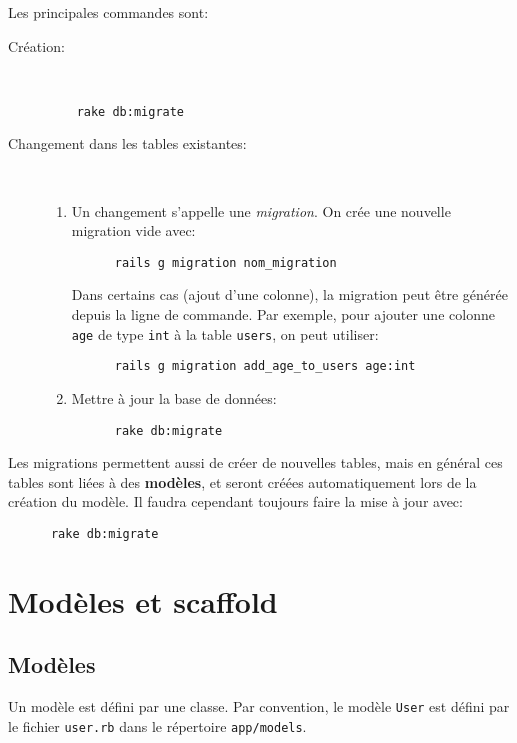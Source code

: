 \documentclass{article}
\begin{document}
Les principales commandes sont:
\begin{description}
\item[Création:] ~\\
  \begin{lstlisting}
    rake db:migrate
  \end{lstlisting}
\item[Changement dans les tables existantes:] ~\\
  \begin{enumerate}
  \item Un changement s'appelle une \emph{migration}. On crée une
    nouvelle migration vide avec:
    \begin{lstlisting}
      rails g migration nom_migration
    \end{lstlisting}
    Dans certains cas (ajout d'une colonne), la migration peut être générée depuis
    la ligne de commande. Par exemple, pour ajouter une colonne \texttt{age} de type \texttt{int}
    à la table \texttt{users}, on peut utiliser:
    \begin{lstlisting}
      rails g migration add_age_to_users age:int
    \end{lstlisting}
  \item Mettre à jour la base de données:
    \begin{lstlisting}
      rake db:migrate
    \end{lstlisting}
    \end{enumerate}
\end{description}
Les migrations permettent aussi de créer de nouvelles tables, mais en
général ces tables sont liées à des \textbf{modèles}, et seront créées automatiquement lors de la création du modèle. Il faudra cependant toujours faire la mise à jour avec:
    \begin{lstlisting}
      rake db:migrate
    \end{lstlisting}
 

\section{Modèles et scaffold}

\subsection{Modèles}

Un modèle est défini par une classe. Par convention, le modèle
\texttt{User} est défini par le fichier \texttt{user.rb} dans le
répertoire \texttt{app/models}. 
\end{document}
